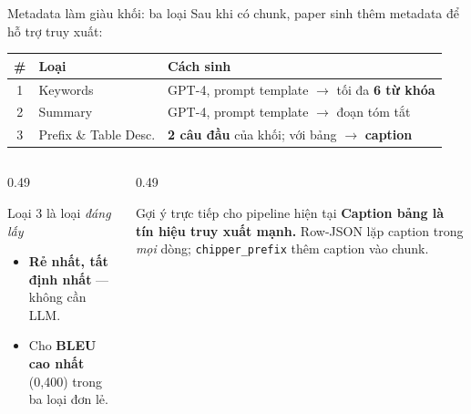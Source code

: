 \documentclass[aspectratio=169,11pt]{beamer}
\begin{document}
\begin{frame}{Metadata làm giàu khối: ba loại}
  {\small Sau khi có chunk, paper sinh thêm metadata để hỗ trợ truy xuất:}
  \vspace{0.2em}
  \centering\footnotesize
  \begin{tabular}{@{}cl l@{}}
    \toprule
    \textbf{\#} & \textbf{Loại} & \textbf{Cách sinh} \\
    \midrule
    1 & Keywords & GPT-4, prompt template $\rightarrow$ tối đa \textbf{6 từ khóa} \\
    2 & Summary & GPT-4, prompt template $\rightarrow$ đoạn tóm tắt \\
    3 & Prefix \& Table Desc. & \textbf{2 câu đầu} của khối; với bảng $\rightarrow$ \textbf{caption} \\
    \bottomrule
  \end{tabular}
  \vspace{0.5em}
  \begin{columns}[T]
    \begin{column}{0.49\textwidth}
      \begin{block}{\small Loại 3 là loại \emph{đáng lấy}}
        \begin{itemize}\small
          \item \textbf{Rẻ nhất, tất định nhất} — không cần LLM.
          \item Cho \textbf{BLEU cao nhất} (0,400) trong ba loại đơn lẻ.
        \end{itemize}
      \end{block}
    \end{column}
    \begin{column}{0.49\textwidth}
      \begin{alertblock}{\small Gợi ý trực tiếp cho pipeline hiện tại}
        \textbf{Caption bảng là tín hiệu truy xuất mạnh.} Row-JSON lặp caption
        trong \emph{mọi} dòng; \texttt{chipper\_prefix} thêm caption vào chunk.
      \end{alertblock}
    \end{column}
  \end{columns}
\end{frame}
\end{document}
